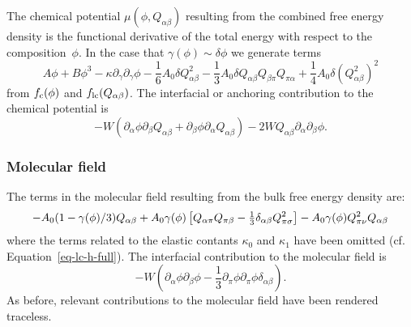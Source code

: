 The chemical potential $\mu(\phi,Q_{\alpha\beta})$ resulting from the
combined free energy density is the functional derivative of the
total energy with respect to the composition~$\phi$. In the
case that $\gamma(\phi) \sim \delta\phi$ we generate terms
\begin{equation}
A\phi + B\phi^3 -\kappa \partial_{\gamma}\partial_{\gamma}\phi
- \textstyle{\frac{1}{6}} A_0 \delta Q_{\alpha\beta}^2
- \textstyle{\frac{1}{3}} A_0 \delta
                          Q_{\alpha\beta} Q_{\beta\pi} Q_{\pi\alpha}
+ \textstyle{\frac{1}{4}} A_0 \delta (Q_{\alpha\beta}^2)^2
\end{equation}
from $f_{\rm c}(\phi)$ and $f_{\rm lc}(Q_{\alpha\beta})$.
The interfacial or anchoring contribution to the chemical potential is
\begin{equation} 
-W \left(
 \partial_{\alpha}\phi\partial_{\beta}Q_{\alpha\beta}
+\partial_{\beta}\phi\partial_{\alpha}Q_{\alpha\beta}\right)
- 2W Q_{\alpha\beta} \partial_\alpha\partial_\beta\phi.
\end{equation}

\subsubsection{Molecular field}

The terms in the molecular field resulting from the bulk free energy
density are:
\begin{equation}
-A_0 (1 - \gamma(\phi)/3) Q_{\alpha\beta}
+A_0 \gamma(\phi)\left[ Q_{\alpha\pi} Q_{\pi\beta}
     - {\textstyle\frac{1}{3}} \delta_{\alpha\beta} Q_{\pi\sigma}^2\right]
-A_0 \gamma (\phi)Q_{\pi\nu}^2 Q_{\alpha\beta} \\ \nonumber
\end{equation}
where the terms related to the elastic contants $\kappa_0$ and $\kappa_1$
have been omitted (cf. Equation~\ref{eq-lc-h-full}). The interfacial
contribution to the molecular field is
\begin{equation}
-W \left( \partial_{\alpha}\phi\partial_{\beta}\phi
- {\textstyle\frac{1}{3}}
  \partial_{\pi}\phi \partial_{\pi}\phi \delta_{\alpha\beta} \right).
\end{equation}
As before, relevant contributions to the molecular field have
been rendered traceless.

